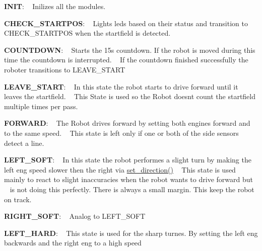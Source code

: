 \begin{DoxyItemize}
\item {\bfseries I\+N\+IT}\+: ~\newline
 Inilizes all the modules.
\item {\bfseries C\+H\+E\+C\+K\+\_\+\+S\+T\+A\+R\+T\+P\+OS}\+: ~\newline
 Lights leds based on their status and transition to C\+H\+E\+C\+K\+\_\+\+S\+T\+A\+R\+T\+P\+OS when the startfield is detected.
\item {\bfseries C\+O\+U\+N\+T\+D\+O\+WN}\+: ~\newline
 Starts the 15s countdown. If the robot is moved during this time the countdown is interrupted. ~\newline
 If the countdown finished successfully the roboter transitions to L\+E\+A\+V\+E\+\_\+\+S\+T\+A\+RT
\item {\bfseries L\+E\+A\+V\+E\+\_\+\+S\+T\+A\+RT}\+: ~\newline
 In this state the robot starts to drive forward until it leaves the startfield. ~\newline
 This State is used so the Robot doesn\textquotesingle{}t count the startfield multiple times per pass.
\item {\bfseries F\+O\+R\+W\+A\+RD}\+: ~\newline
 The Robot drives forward by setting both engines forward and to the same speed. ~\newline
 This state is left only if one or both of the side sensors detect a line.
\item {\bfseries L\+E\+F\+T\+\_\+\+S\+O\+FT}\+: ~\newline
 In this state the robot performes a slight turn by making the left eng speed slower then the right via \hyperlink{motor__controller_8c_aedcc8ddfc6f7a9d3f55833ac09fa01f5}{set\+\_\+direction()} ~\newline
 This state is used mainly to react to slight inaccuracies when the robot wants to drive forward but ~\newline
 is not doing this perfectly. There is always a small margin. This keep the robot on track.
\item {\bfseries R\+I\+G\+H\+T\+\_\+\+S\+O\+FT}\+: ~\newline
 Analog to L\+E\+F\+T\+\_\+\+S\+O\+FT
\item {\bfseries L\+E\+F\+T\+\_\+\+H\+A\+RD}\+: ~\newline
 This state is used for the sharp turnes. By setting the left eng backwards and the right eng to a high speed ~\newline

\end{DoxyItemize}
